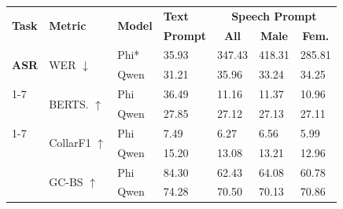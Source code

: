 
\begin{table}[]
    \centering
    \footnotesize
    \begin{tabular}{p{0.6cm}p{1.3cm}p{0.6cm}p{0.7cm}p{0.7cm}p{0.7cm}p{0.7cm}}
     \toprule
     \multirow{2}{*}{\textbf{Task}} & \multirow{2}{*}{\textbf{Metric}} & \multirow{2}{*}{\textbf{Model}} & \textbf{Text} & \multicolumn{3}{c}{\textbf{Speech Prompt}} \\
     &&& \textbf{Prompt} & \multicolumn{1}{c}{\textbf{All}} & \multicolumn{1}{c}{\textbf{Male}} & \multicolumn{1}{c}{\textbf{Fem.}} \\
     \midrule
     \multirow{2}{*}{\textbf{ASR}} & \multirow{2}{*}{WER $\downarrow$} & Phi* & \cellcolor{taskgreen!79} 35.93 & \cellcolor{taskgreen!20} 347.43 & \cellcolor{taskorange!20} 418.31 & \cellcolor{taskorange!41} 285.81 \\
      &  & Qwen & \cellcolor{taskgreen!80} 31.21 & \cellcolor{taskgreen!79} 35.96 & \cellcolor{taskorange!80} 33.24 & \cellcolor{taskorange!80} 34.25 \\
     \cmidrule(lr){1-7}
     \multirow{2}{*}{\textbf{SQA}} & \multirow{2}{*}{BERTS. $\uparrow$} & Phi & \cellcolor{taskblue!80} 36.49 & \cellcolor{taskblue!20} 11.16 & \cellcolor{taskpink!22} 11.37 & \cellcolor{taskpink!20} 10.96 \\
      &  & Qwen & \cellcolor{taskblue!60} 27.85 & \cellcolor{taskblue!58} 27.12 & \cellcolor{taskpink!80} 27.13 & \cellcolor{taskpink!80} 27.11 \\
     \cmidrule(lr){1-7}
     \multirow{4}{*}{\textbf{ACHAP}} & \multirow{2}{*}{CollarF1 $\uparrow$} & Phi & \cellcolor{taskgreen!28} 7.49 & \cellcolor{taskgreen!20} 6.27 & \cellcolor{taskorange!25} 6.56 & \cellcolor{taskorange!20} 5.99 \\
      &  & Qwen & \cellcolor{taskgreen!80} 15.20 & \cellcolor{taskgreen!66} 13.08 & \cellcolor{taskorange!80} 13.21 & \cellcolor{taskorange!78} 12.96 \\
      & \multirow{2}{*}{GC-BS $\uparrow$} & Phi & \cellcolor{taskgreen!80} 84.30 & \cellcolor{taskgreen!20} 62.43 & \cellcolor{taskorange!40} 64.08 & \cellcolor{taskorange!20} 60.78 \\
      &  & Qwen & \cellcolor{taskgreen!53} 74.28 & \cellcolor{taskgreen!42} 70.50 & \cellcolor{taskorange!76} 70.13 & \cellcolor{taskorange!80} 70.86 \\

\end{tabular}
\end{table}
